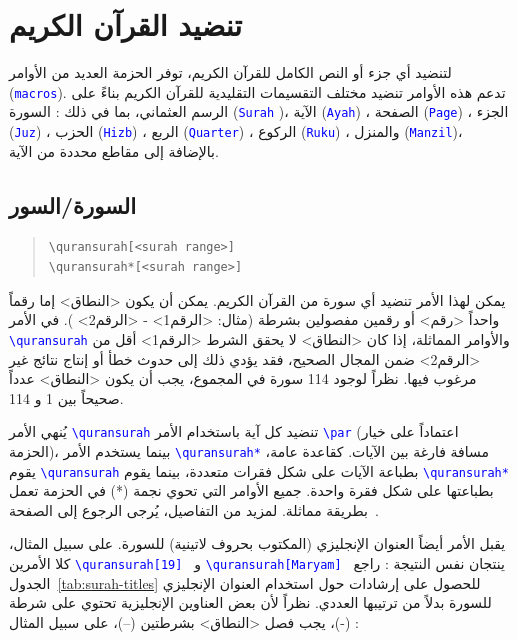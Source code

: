 \documentclass[12pt,a4paper]{article}
\newcommand{\cmd}[1]{\textenglish{\textcolor{blue}{\texttt{\textbackslash #1}}}}
\begin{document}
\section{تنضيد القرآن الكريم}
\label{sec:qurantypesetting}  

لتنضيد أي جزء أو النص الكامل للقرآن الكريم، توفر الحزمة العديد من الأوامر 
(\textcolor{blue}{\texttt{macros}}).
 تدعم هذه الأوامر تنضيد مختلف التقسيمات التقليدية للقرآن الكريم بناءً على الرسم العثماني، بما في ذلك : 
 السورة
  (\textcolor{blue}{\texttt{Surah}}
  )، الآية 
  (\textcolor{blue}{\texttt{Ayah}})
  ، الصفحة 
  (\textcolor{blue}{\texttt{Page}})
  ، الجزء 
  (\textcolor{blue}{\texttt{Juz}})
  ، الحزب 
  (\textcolor{blue}{\texttt{Hizb}})
  ، الربع 
  (\textcolor{blue}{\texttt{Quarter}})
  ، الركوع 
  (\textcolor{blue}{\texttt{Ruku}})
  ، والمنزل
   (\textcolor{blue}{\texttt{Manzil}})، بالإضافة إلى مقاطع محددة من الآية.


\subsection{السورة/السور}  %


\begin{english}
\begin{quote}
\begin{lstlisting}[style=BashInputStyle]
\quransurah[<surah range>]
\quransurah*[<surah range>]
\end{lstlisting}
\end{quote}
\end{english}

يمكن لهذا الأمر  تنضيد أي سورة من القرآن الكريم. يمكن أن يكون <النطاق> إما رقماً واحداً <رقم> أو رقمين مفصولين بشرطة (مثال: <الرقم1> -  <الرقم2> ). في الأمر 
\cmd{quransurah}
 والأوامر المماثلة، إذا كان <النطاق> لا يحقق الشرط <الرقم1> أقل من  <الرقم2> ضمن المجال الصحيح، فقد يؤدي ذلك إلى حدوث خطأ أو إنتاج نتائج غير مرغوب فيها. نظراً لوجود 114 سورة في المجموع، يجب أن يكون <النطاق> عدداً صحيحاً بين 1 و 114.

يُنهي الأمر
\cmd{quransurah}  تنضيد كل آية باستخدام الأمر \cmd{par} (اعتماداً على خيار الحزمة)، بينما يستخدم الأمر
\cmd{quransurah*}  مسافة فارغة بين الآيات. كقاعدة عامة، يقوم 
\cmd{quransurah} بطباعة الآيات على شكل فقرات متعددة، بينما يقوم 
\cmd{quransurah*} بطباعتها على شكل فقرة واحدة. جميع الأوامر التي تحوي نجمة (*) في الحزمة تعمل بطريقة مماثلة. لمزيد من التفاصيل، يُرجى الرجوع إلى الصفحة~\pageref{starred}.

يقبل الأمر أيضاً العنوان الإنجليزي (المكتوب بحروف لاتينية) للسورة. على سبيل المثال، كلا الأمرين
\cmd{quransurah[19] } و 
\cmd{quransurah[Maryam] }
ينتجان نفس النتيجة : راجع الجدول~\ref{tab:surah-titles} للحصول على إرشادات حول استخدام العنوان الإنجليزي للسورة بدلاً من ترتيبها العددي. نظراً لأن بعض العناوين الإنجليزية تحتوي على شرطة (-)، يجب فصل  <النطاق> بشرطتين (--)، على سبيل المثال :
\end{document}
